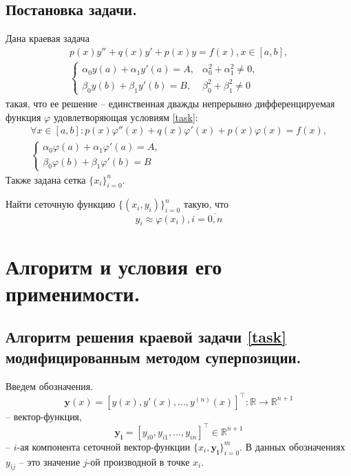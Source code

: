 \documentclass[a4paper, 12pt]{article}
\begin{document}
	\subsection{Постановка задачи.}
	
	Дана краевая задача
	\begin{equation} \label{task}
		\begin{gathered}
			p(x)y''+q(x)y'+p(x)y=f(x), x\in[a,b],\\
			\begin{cases}
				\alpha_0y(a)+\alpha_1y'(a)=A, &\alpha_0^2+\alpha_1^2\neq0,\\
				\beta_0y(b)+\beta_1y'(b)=B, &\beta_0^2+\beta_1^2\neq0
			\end{cases}
		\end{gathered}
	\end{equation}
	такая, что ее решение -- единственная дважды непрерывно дифференцируемая функция $\varphi$ удовлетворяющая условиям \eqref{task}:
	\begin{equation}
		\begin{gathered}
			\forall x\in[a,b]: p(x)\varphi''(x)+q(x)\varphi'(x)+p(x)\varphi(x)=f(x),\\ 
			\begin{cases}
				\alpha_0\varphi(a)+\alpha_1\varphi'(a)=A,\\
				\beta_0\varphi(b)+\beta_1\varphi'(b)=B
			\end{cases}
		\end{gathered}
	\end{equation}
	Также задана сетка $\{x_i\}_{i=0}^n$.
	
	Найти сеточную функцию $\{(x_i,y_i)\}_{i=0}^n$ такую, что
	\begin{equation}
		y_i\approx\varphi(x_i), i=\overline{0,n}
	\end{equation}
	
	\section{Алгоритм и условия его применимости.}
	
	\subsection{Алгоритм решения краевой задачи \eqref{task} модифицированным методом суперпозиции.}
	\label{alghorithm_simple}
	
	Введем обозначения. 
	\begin{equation}
		\mathbf{y}(x)=[y(x),y'(x),...,y^{(n)}(x)]^\top : \mathbb{R}\rightarrow\mathbb{R}^{n+1}
	\end{equation}
	-- вектор-функция,
	\begin{equation}
		\mathbf{y_i}=[y_{i0},y_{i1},...,y_{in}]^\top\in \mathbb{R}^{n+1}
	\end{equation}
	-- $i$-ая компонента сеточной вектор-функции $\{x_i, \mathbf{y_i}\}_{i=0}^m$. В данных обозначениях $y_{ij}$ -- это значение $j$-ой производной в точке $x_i$.
	
\end{document}
